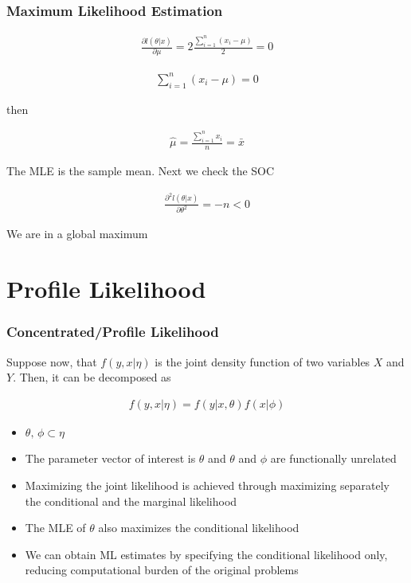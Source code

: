 \documentclass[
  shownotes,
  xcolor={svgnames},
  hyperref={colorlinks,citecolor=DarkBlue,linkcolor=DarkRed,urlcolor=DarkBlue}
  , aspectratio=169]{beamer}
\begin{document}
\begin{frame}[fragile]
\frametitle{Maximum Likelihood Estimation}

\begin{align}
\frac{\partial l\left(\theta |x\right)}{\partial\mu}=2\frac{\sum_{i=1}^{n}\left(x_{i}-\mu\right)}{2}=0
\end{align}


\begin{align}
\sum_{i=1}^{n}\left(x_{i}-\mu \right)=0
\end{align}

then

\begin{align}
\hat{\mu}=\frac{\sum_{i=1}^{n}x_{i}}{n}=\bar{x}
\end{align}

The MLE is the sample mean. Next we check the SOC


\begin{align}
\frac{\partial^2l(\theta|x)}{\partial \theta^2}=-n<0
\end{align}

We are in  a global maximum

\end{frame}
\section{Profile Likelihood }
\begin{frame}[fragile]
\frametitle{Concentrated/Profile Likelihood }

Suppose now, that $f(y,x|\eta)$ is the joint density function of two variables $X$ and $Y$.  Then, it can be decomposed as

\begin{align}
f(y,x|\eta) =f(y|x,\theta)f(x|\phi)
\end{align}

\begin{itemize}
  \item $\theta,\,\phi \subset \eta$ 
  \medskip
  \item The parameter vector of interest is  $\theta$ and $\theta$ and $\phi$ are functionally unrelated
  \medskip
  \item Maximizing the joint likelihood is achieved through maximizing separately the conditional and the marginal likelihood
  \medskip
  \item The MLE of $\theta$ also maximizes the conditional likelihood  
  \medskip
  \item We can obtain ML estimates by specifying the conditional likelihood only, reducing computational burden of the original problems
\end{itemize}  
\end{frame}
\end{document}
